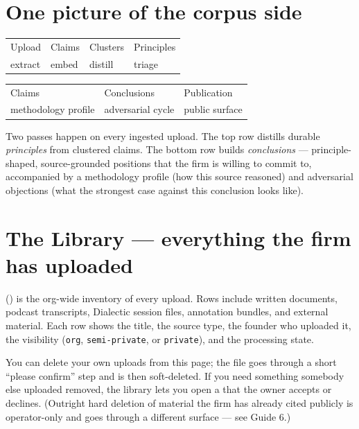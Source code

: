 \documentclass[11pt]{article}
\begin{document}
\section{One picture of the corpus side}

\begin{center}
\begin{tabular}{l@{\;\(\to\)\;}l@{\;\(\to\)\;}l@{\;\(\to\)\;}l}
\sffamily Upload & \sffamily Claims & \sffamily Clusters & \sffamily Principles \\
\sffamily extract & \sffamily embed & \sffamily distill & \sffamily triage \\
\end{tabular}

\medskip

\begin{tabular}{l@{\;\(\to\)\;}l@{\;\(\to\)\;}l}
\sffamily Claims & \sffamily Conclusions & \sffamily Publication \\
\sffamily methodology profile & \sffamily adversarial cycle & \sffamily public surface \\
\end{tabular}
\end{center}

Two passes happen on every ingested upload. The top row distills
durable \emph{principles} from clustered claims. The bottom row builds
\emph{conclusions} --- principle-shaped, source-grounded positions
that the firm is willing to commit to, accompanied by a methodology
profile (how this source reasoned) and adversarial objections (what
the strongest case against this conclusion looks like).

\section{The Library --- everything the firm has uploaded}

 () is the org-wide inventory of every
upload. Rows include written documents, podcast transcripts, Dialectic
session files, annotation bundles, and external material. Each row
shows the title, the source type, the founder who uploaded it, the
visibility (\texttt{org}, \texttt{semi-private}, or \texttt{private}),
and the processing state.

You can delete your own uploads from this page; the file goes through
a short ``please confirm'' step and is then soft-deleted. If you need
something somebody else uploaded removed, the library lets you open a
 that the owner accepts or declines. (Outright
hard deletion of material the firm has already cited publicly is
operator-only and goes through a different surface --- see Guide 6.)
\end{document}
